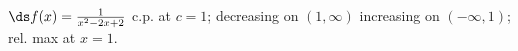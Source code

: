 {$\ds f(x) =\frac{1}{x^2-2x+2}$
}
{c.p. at $c=1$; 
decreasing on $(1,\infty)$
increasing on $(-\infty,1)$;
rel. max at $x=1$.
}
